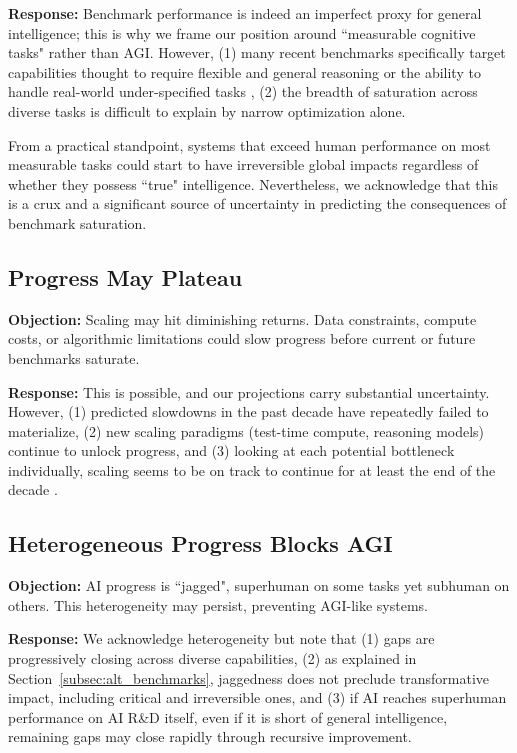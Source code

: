 \documentclass[letterpaper,twocolumn]{article}
\begin{document}
\textbf{Response:} Benchmark performance is indeed an imperfect proxy for general intelligence; this is why we frame our position around ``measurable cognitive tasks" rather than AGI.
However, (1) many recent benchmarks specifically target capabilities thought to require flexible and general reasoning \citep{arc_prize_arc-agi-2_2025, wang_enigmaeval_2025} or the ability to handle real-world under-specified tasks \citep{mazeika_remote_2025}, (2) the breadth of saturation across diverse tasks is difficult to explain by narrow optimization alone.

From a practical standpoint, systems that exceed human performance on most measurable tasks could start to have irreversible global impacts regardless of whether they possess ``true" intelligence. Nevertheless, we acknowledge that this is a crux and a significant source of uncertainty in predicting the consequences of benchmark saturation.

\subsection{Progress May Plateau}
\label{subsec:alt_plateau}

\textbf{Objection:} Scaling may hit diminishing returns.
Data constraints, compute costs, or algorithmic limitations could slow progress before current or future benchmarks saturate.

\textbf{Response:} This is possible, and our projections carry substantial uncertainty.
However, (1) predicted slowdowns in the past decade have repeatedly failed to materialize, (2) new scaling paradigms (test-time compute, reasoning models) continue to unlock progress, and (3) looking at each potential bottleneck individually, scaling seems to be on track to continue for at least the end of the decade \citep{sevilla_can_2024}.

\subsection{Heterogeneous Progress Blocks AGI}
\label{subsec:alt_heterogeneous}

\textbf{Objection:} AI progress is ``jagged", superhuman on some tasks yet subhuman on others.
This heterogeneity may persist, preventing AGI-like systems.

\textbf{Response:} We acknowledge heterogeneity but note that (1) gaps are progressively closing across diverse capabilities, (2) as explained in Section~\ref{subsec:alt_benchmarks}, jaggedness does not preclude transformative impact, including critical and irreversible ones, and (3) if AI reaches superhuman performance on AI R\&D itself, even if it is short of general intelligence, remaining gaps may close rapidly through recursive improvement.
\end{document}
